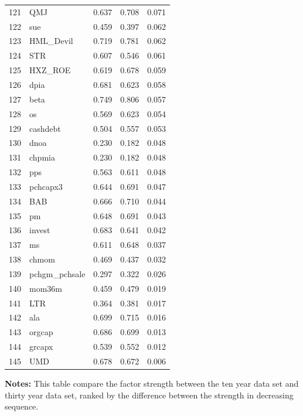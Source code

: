 \documentclass[12pt]{article}
\begin{document}
\begin{footnotesize}
\begin{longtable}{rl|c|c|c}
		121 & QMJ & 0.637 & 0.708 & 0.071 \\ 
		122 & sue & 0.459 & 0.397 & 0.062 \\ 
		123 & HML\_Devil & 0.719 & 0.781 & 0.062 \\ 
		124 & STR & 0.607 & 0.546 & 0.061 \\ 
		125 & HXZ\_ROE & 0.619 & 0.678 & 0.059 \\ 
		126 & dpia & 0.681 & 0.623 & 0.058 \\ 
		127 & beta & 0.749 & 0.806 & 0.057 \\ 
		128 & os & 0.569 & 0.623 & 0.054 \\ 
		129 & cashdebt & 0.504 & 0.557 & 0.053 \\ 
		130 & dnoa & 0.230 & 0.182 & 0.048 \\ 
		131 & chpmia & 0.230 & 0.182 & 0.048 \\ 
		132 & pps & 0.563 & 0.611 & 0.048 \\ 
		133 & pchcapx3 & 0.644 & 0.691 & 0.047 \\ 
		134 & BAB & 0.666 & 0.710 & 0.044 \\ 
		135 & pm & 0.648 & 0.691 & 0.043 \\ 
		136 & invest & 0.683 & 0.641 & 0.042 \\ 
		137 & ms & 0.611 & 0.648 & 0.037 \\ 
		138 & chmom & 0.469 & 0.437 & 0.032 \\ 
		139 & pchgm\_pchsale & 0.297 & 0.322 & 0.026 \\ 
		140 & mom36m & 0.459 & 0.479 & 0.019 \\ 
		141 & LTR & 0.364 & 0.381 & 0.017 \\ 
		142 & ala & 0.699 & 0.715 & 0.016 \\ 
		143 & orgcap & 0.686 & 0.699 & 0.013 \\ 
		144 & grcapx & 0.539 & 0.552 & 0.012 \\ 
		145 & UMD & 0.678 & 0.672 & 0.006 \\ 
		\hline
	\end{longtable}

			\begin{minipage}{0.7\textwidth}
	{\footnotesize {\bf Notes:} 	This table compare the factor strength between the ten year data set and thirty year data set, ranked by the difference between the strength in decreasing sequence.}
\end{minipage}

\end{footnotesize}
\end{document}

